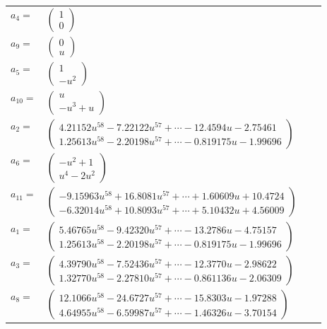 \documentclass[1p]{elsarticle_modified}
\theoremstyle{definition}
\begin{document}
\begin{tabular}{m{7pt} m{180pt} m{7pt} m{180pt} }
\flushright $a_{4}=$&$\begin{pmatrix}1\\0\end{pmatrix}$ \\
\flushright $a_{9}=$&$\begin{pmatrix}0\\u\end{pmatrix}$ \\
\flushright $a_{5}=$&$\begin{pmatrix}1\\- u^2\end{pmatrix}$ \\
\flushright $a_{10}=$&$\begin{pmatrix}u\\- u^3+u\end{pmatrix}$ \\
\flushright $a_{2}=$&$\begin{pmatrix}4.21152 u^{58}-7.22122 u^{57}+\cdots-12.4594 u-2.75461\\1.25613 u^{58}-2.20198 u^{57}+\cdots-0.819175 u-1.99696\end{pmatrix}$ \\
\flushright $a_{6}=$&$\begin{pmatrix}- u^2+1\\u^4-2 u^2\end{pmatrix}$ \\
\flushright $a_{11}=$&$\begin{pmatrix}-9.15963 u^{58}+16.8081 u^{57}+\cdots+1.60609 u+10.4724\\-6.32014 u^{58}+10.8093 u^{57}+\cdots+5.10432 u+4.56009\end{pmatrix}$ \\
\flushright $a_{1}=$&$\begin{pmatrix}5.46765 u^{58}-9.42320 u^{57}+\cdots-13.2786 u-4.75157\\1.25613 u^{58}-2.20198 u^{57}+\cdots-0.819175 u-1.99696\end{pmatrix}$ \\
\flushright $a_{3}=$&$\begin{pmatrix}4.39790 u^{58}-7.52436 u^{57}+\cdots-12.3770 u-2.98622\\1.32770 u^{58}-2.27810 u^{57}+\cdots-0.861136 u-2.06309\end{pmatrix}$ \\
\flushright $a_{8}=$&$\begin{pmatrix}12.1066 u^{58}-24.6727 u^{57}+\cdots-15.8303 u-1.97288\\4.64955 u^{58}-6.59987 u^{57}+\cdots-1.46326 u-3.70154\end{pmatrix}$ \\

\end{tabular}
\end{document}

